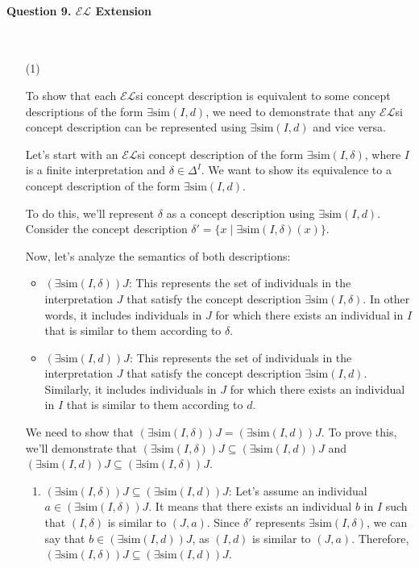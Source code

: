 \documentclass[12pt]{article}
\begin{document}
    \paragraph{Question 9. $\mathcal{EL}$ Extension}~{}
    \\
    \begin{enumerate}
        \item [(1)]

To show that each $\mathcal{EL}$si concept description is equivalent to some concept descriptions of the form $\exists \text{sim}(I, d)$, we need to demonstrate that any $\mathcal{EL}$si concept description can be represented using $\exists \text{sim}(I, d)$ and vice versa.

Let's start with an $\mathcal{EL}$si concept description of the form $\exists \text{sim}(I, \delta)$, where $I$ is a finite interpretation and $\delta \in \Delta^I$. We want to show its equivalence to a concept description of the form $\exists \text{sim}(I, d)$.

To do this, we'll represent $\delta$ as a concept description using $\exists \text{sim}(I, d)$. Consider the concept description $\delta' = \{x \mid \exists \text{sim}(I, \delta)(x)\}$.

Now, let's analyze the semantics of both descriptions:

\begin{itemize}
  \item $(\exists \text{sim}(I, \delta))J$: This represents the set of individuals in the interpretation $J$ that satisfy the concept description $\exists \text{sim}(I, \delta)$. In other words, it includes individuals in $J$ for which there exists an individual in $I$ that is similar to them according to $\delta$.

  \item $(\exists \text{sim}(I, d))J$: This represents the set of individuals in the interpretation $J$ that satisfy the concept description $\exists \text{sim}(I, d)$. Similarly, it includes individuals in $J$ for which there exists an individual in $I$ that is similar to them according to $d$.
\end{itemize}

We need to show that $(\exists \text{sim}(I, \delta))J = (\exists \text{sim}(I, d))J$. To prove this, we'll demonstrate that $(\exists \text{sim}(I, \delta))J \subseteq (\exists \text{sim}(I, d))J$ and $(\exists \text{sim}(I, d))J \subseteq (\exists \text{sim}(I, \delta))J$.

\begin{enumerate}
  \item $(\exists \text{sim}(I, \delta))J \subseteq (\exists \text{sim}(I, d))J$: Let's assume an individual $a \in (\exists \text{sim}(I, \delta))J$. It means that there exists an individual $b$ in $I$ such that $(I, \delta)$ is similar to $(J, a)$. Since $\delta'$ represents $\exists \text{sim}(I, \delta)$, we can say that $b \in (\exists \text{sim}(I, d))J$, as $(I, d)$ is similar to $(J, a)$. Therefore, $(\exists \text{sim}(I, \delta))J \subseteq (\exists \text{sim}(I, d))J$.


\end{enumerate}
\end{enumerate}
\end{document}
